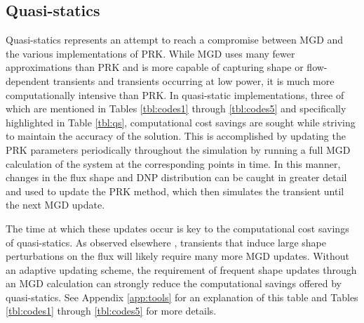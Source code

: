 \documentclass[review]{elsarticle}
\begin{document}
\subsection{Quasi-statics} \label{ssec:qs}
Quasi-statics represents an attempt to
reach a compromise between MGD and the various implementations of PRK. While
MGD uses many fewer approximations than PRK and is more capable of 
capturing shape or flow-dependent transients and transients occurring
at low power,
it is much more computationally intensive than PRK. In quasi-static
implementations, three of which are mentioned in Tables \ref{tbl:codes1}
through \ref{tbl:codes5} and specifically highlighted in
Table \ref{tbl:qs},
computational cost savings are sought while striving to maintain the accuracy
of the solution. This is accomplished by updating the PRK parameters 
periodically throughout the simulation
by running a full MGD calculation of the system at the corresponding points
in time. In this manner, changes in the flux shape and DNP distribution can
be caught in greater detail and used to update the PRK method, which then 
simulates the transient until the next MGD update.
\par The time at which these updates occur is key to the computational
 cost savings of
quasi-statics. As observed elsewhere \cite{dulla_models_2005}, transients that induce
large shape perturbations on the flux will likely require many more MGD
updates. Without an adaptive
updating scheme, the requirement of frequent shape updates through an MGD
calculation can strongly reduce the computational savings offered by
quasi-statics. See Appendix \ref{app:tools} for an explanation of this table 
and Tables \ref{tbl:codes1} through \ref{tbl:codes5} for more details.
\end{document}
